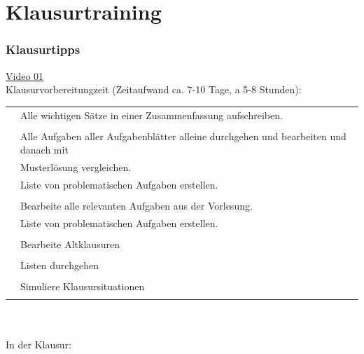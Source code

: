 \chapter{Klausurtraining}

\setcounter{section}{15}
\setcounter{subsection}{0}
\setcounter{subsubsection}{1}
\setcounter{secnumdepth}{4}
\subsection{Klausurtipps}
\href{https://youtu.be/uMfjDH8dFl4}{Video 01}\\
Klausurvorbereitungzeit  (Zeitaufwand ca. 7-10 Tage, a 5-8 Stunden):\\

\begin{tabular}[t]{ll}%
	\textbullet & Alle wichtigen Sätze in einer Zusammenfassung aufschreiben.  \\
	&\\
	\textbullet&Alle Aufgaben aller Aufgabenblätter alleine durchgehen und bearbeiten und danach mit\\
	& Musterlösung vergleichen. \\
	& Liste von problematischen Aufgaben erstellen.\\
	&\\
	\textbullet&Bearbeite alle relevanten Aufgaben aus der Vorlesung.\\
	&Liste von problematischen Aufgaben erstellen.\\
	&\\
	\textbullet&Bearbeite Altklausuren\\
	&\\
	\textbullet&Listen durchgehen\\
	&\\
	\textbullet&Simuliere Klausursituationen\\
	&\\
\end{tabular}\\
\\
In der Klausur:\\

